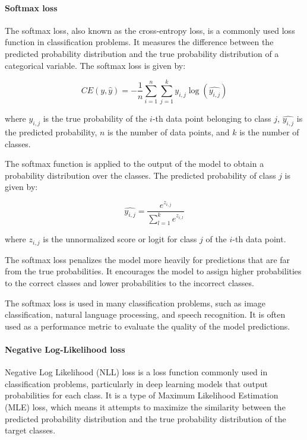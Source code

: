 \paragraph{Softmax loss}
\label{par:3_softmax_loss}

The softmax loss, also known as the cross-entropy loss, is a commonly used loss function in classification problems. It measures the difference between the predicted probability distribution and the true probability distribution of a categorical variable. The softmax loss is given by:

\begin{equation}
	CE(y, \hat{y}) = -\frac{1}{n}\sum_{i=1}^{n}\sum_{j=1}^{k} y_{i,j}\log(\hat{y_{i,j}})
\end{equation}

where $y_{i,j}$ is the true probability of the $i$-th data point belonging to class $j$, $\hat{y_{i,j}}$ is the predicted probability, $n$ is the number of data points, and $k$ is the number of classes.

The softmax function is applied to the output of the model to obtain a probability distribution over the classes. The predicted probability of class $j$ is given by:

\begin{equation}
	\hat{y_{i,j}} = \frac{e^{z_{i,j}}}{\sum_{l=1}^{k} e^{z_{i,l}}}
\end{equation}

where $z_{i,j}$ is the unnormalized score or logit for class $j$ of the $i$-th data point.

The softmax loss penalizes the model more heavily for predictions that are far from the true probabilities. It encourages the model to assign higher probabilities to the correct classes and lower probabilities to the incorrect classes.

The softmax loss is used in many classification problems, such as image classification, natural language processing, and speech recognition. It is often used as a performance metric to evaluate the quality of the model predictions.

\paragraph{Negative Log-Likelihood loss}
\label{par:3_NLL_loss}

Negative Log Likelihood (NLL) loss is a loss function commonly used in classification problems, particularly in deep learning models that output probabilities for each class. It is a type of Maximum Likelihood Estimation (MLE) loss, which means it attempts to maximize the similarity between the predicted probability distribution and the true probability distribution of the target classes.

